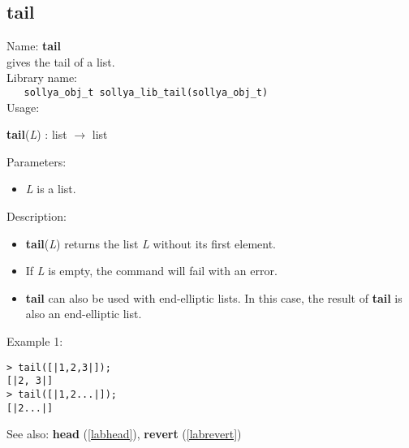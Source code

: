 \subsection{tail}
\label{labtail}
\noindent Name: \textbf{tail}\\
\phantom{aaa}gives the tail of a list.\\[0.2cm]
\noindent Library name:\\
\verb|   sollya_obj_t sollya_lib_tail(sollya_obj_t)|\\[0.2cm]
\noindent Usage: 
\begin{center}
\textbf{tail}(\emph{L}) : \textsf{list} $\rightarrow$ \textsf{list}\\
\end{center}
Parameters: 
\begin{itemize}
\item \emph{L} is a list.
\end{itemize}
\noindent Description: \begin{itemize}

\item \textbf{tail}(\emph{L}) returns the list \emph{L} without its first element.

\item If \emph{L} is empty, the command will fail with an error.

\item \textbf{tail} can also be used with end-elliptic lists. In this case, the result of
   \textbf{tail} is also an end-elliptic list.
\end{itemize}
\noindent Example 1: 
\begin{center}\begin{minipage}{15cm}\begin{Verbatim}[frame=single]
> tail([|1,2,3|]);
[|2, 3|]
> tail([|1,2...|]);
[|2...|]
\end{Verbatim}
\end{minipage}\end{center}
See also: \textbf{head} (\ref{labhead}), \textbf{revert} (\ref{labrevert})
